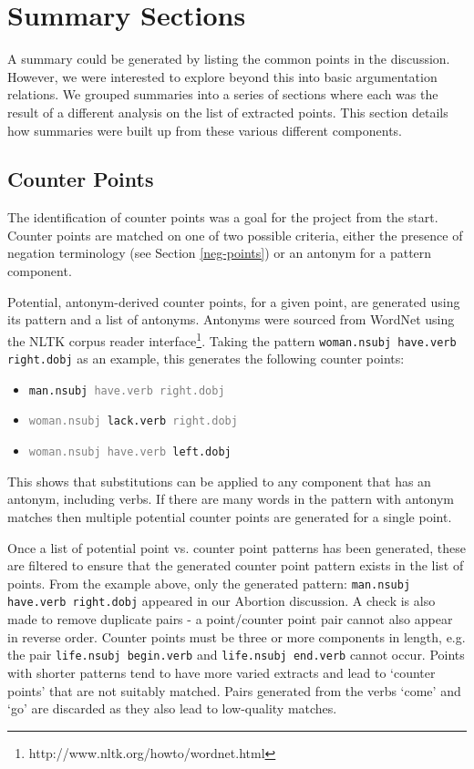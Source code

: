   \section{Summary Sections}
    A summary could be generated by listing the common points in the discussion. However, we were interested to explore beyond this into basic argumentation relations. We grouped summaries into a series of sections where each was the result of a different analysis on the list of extracted points. This section details how summaries were built up from these various different components.

    \subsection{Counter Points}

    The identification of counter points was a goal for the project from the start. Counter points are matched on one of two possible criteria, either the presence of negation terminology (see Section \ref{neg-points}) or an antonym for a pattern component.

      Potential, antonym-derived counter points, for a given point, are generated using its pattern and a list of antonyms. Antonyms were sourced from WordNet \cite{miller1995wordnet} using the NLTK corpus reader interface\footnote{http://www.nltk.org/howto/wordnet.html}. Taking the pattern \texttt{woman.nsubj have.verb right.dobj} as an example, this generates the following counter points:

      \begin{itemize}[label={$\bullet$}]
        \item{\texttt{man.nsubj \textcolor{gray}{have.verb right.dobj}}}
        \item{\texttt{\textcolor{gray}{woman.nsubj} lack.verb \textcolor{gray}{right.dobj}}}
        \item{\texttt{\textcolor{gray}{woman.nsubj have.verb} left.dobj}}
      \end{itemize}

      This shows that substitutions can be applied to any component that has an antonym, including verbs. If there are many words in the pattern with antonym matches then multiple potential counter points are generated for a single point.

      Once a list of potential point vs. counter point patterns has been generated, these are filtered to ensure that the generated counter point pattern exists in the list of points. From the example above, only the generated pattern: \texttt{man.nsubj have.verb right.dobj} appeared in our Abortion discussion. A check is also made to remove duplicate pairs - a point/counter point pair cannot also appear in reverse order. Counter points must be three or more components in length, e.g. the pair \texttt{life.nsubj begin.verb} and \texttt{life.nsubj end.verb} cannot occur. Points with shorter patterns tend to have more varied extracts and lead to `counter points' that are not suitably matched. Pairs generated from the verbs `come' and `go' are discarded as they also lead to low-quality matches.

